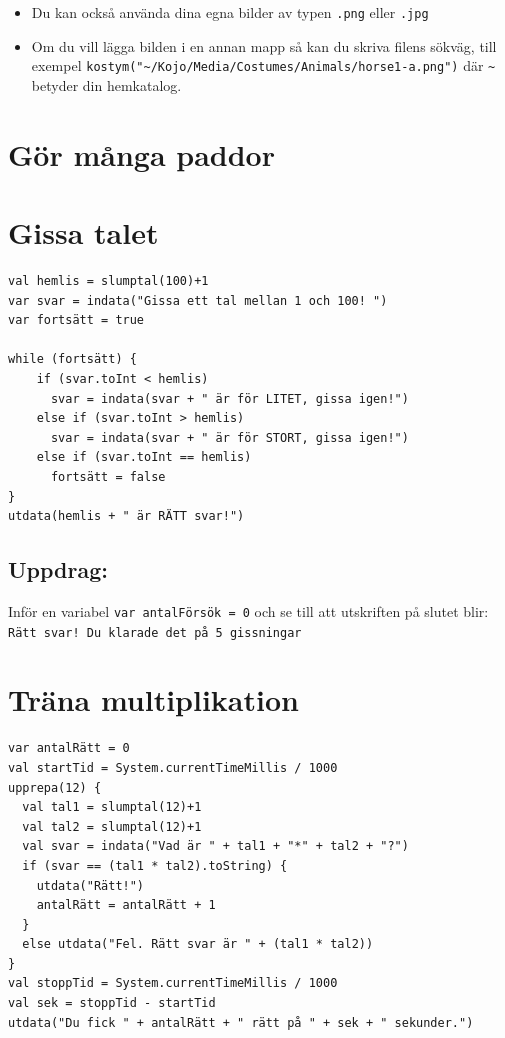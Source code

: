 \begin{itemize}

\item {Du kan också använda dina egna bilder av typen \lstinline{.png} eller \lstinline{.jpg}}
\item {Om du vill lägga bilden i en annan mapp så kan du skriva filens sökväg, till exempel \lstinline{kostym("~/Kojo/Media/Costumes/Animals/horse1-a.png")} där \lstinline{~} betyder din hemkatalog.}

\end{itemize}


\chapter{Gör många paddor}
\chapter{Gissa talet}
\begin{lstlisting}[basicstyle={\ttfamily\fontsize{16}{19}\selectfont},numbers=none]
val hemlis = slumptal(100)+1
var svar = indata("Gissa ett tal mellan 1 och 100! ")
var fortsätt = true

while (fortsätt) {
    if (svar.toInt < hemlis)
      svar = indata(svar + " är för LITET, gissa igen!")
    else if (svar.toInt > hemlis)
      svar = indata(svar + " är för STORT, gissa igen!")
    else if (svar.toInt == hemlis)
      fortsätt = false
}
utdata(hemlis + " är RÄTT svar!")
\end{lstlisting}
        
\section*{\color{BrickRed}Uppdrag:}
Inför en variabel \lstinline{var antalFörsök = 0} och se till att utskriften på slutet blir:\\
\lstinline{Rätt svar! Du klarade det på 5 gissningar}
\chapter{Träna multiplikation}
\begin{lstlisting}[basicstyle={\ttfamily\fontsize{16}{19}\selectfont},numbers=none]
var antalRätt = 0
val startTid = System.currentTimeMillis / 1000
upprepa(12) {
  val tal1 = slumptal(12)+1
  val tal2 = slumptal(12)+1
  val svar = indata("Vad är " + tal1 + "*" + tal2 + "?")
  if (svar == (tal1 * tal2).toString) {
    utdata("Rätt!")
    antalRätt = antalRätt + 1
  }
  else utdata("Fel. Rätt svar är " + (tal1 * tal2))
}
val stoppTid = System.currentTimeMillis / 1000
val sek = stoppTid - startTid
utdata("Du fick " + antalRätt + " rätt på " + sek + " sekunder.")
\end{lstlisting}
        
